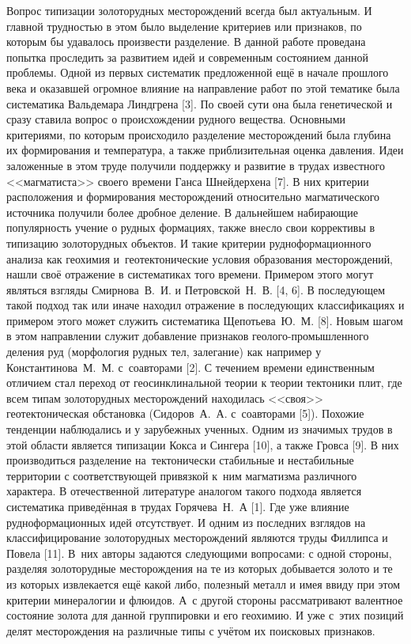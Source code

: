  

\makeProcTitle
{}

Вопрос типизации золоторудных месторождений всегда был актуальным. И главной трудностью в этом было выделение критериев или признаков, по которым бы удавалось произвести разделение. В данной работе проведана попытка проследить за развитием идей и современным состоянием данной проблемы. Одной из первых систематик предложенной ещё в начале прошлого века и оказавшей огромное влияние на направление работ по этой тематике была систематика Вальдемара Линдгрена [3]. По своей сути она была генетической и сразу ставила вопрос о происхождении рудного вещества.  Основными критериями, по которым происходило разделение месторождений была глубина их формирования и температура, а также приблизительная оценка давления. Идеи заложенные в этом труде получили поддержку и развитие в трудах известного <<магматиста>> своего времени Ганса Шнейдерхена [7]. В них критерии расположения и формирования месторождений относительно магматического источника получили более дробное деление.  В дальнейшем набирающие популярность учение о рудных формациях, также внесло свои коррективы в типизацию золоторудных объектов. И такие критерии рудноформационного анализа как геохимия и~геотектонические условия образования месторождений, нашли своё отражение в систематиках того времени. Примером этого могут являться взгляды Смирнова~В.~И. и Петровской~Н.~В. [4, 6]. В последующем такой подход так или иначе находил отражение в последующих классификациях и примером этого может служить систематика Щепотьева~Ю.~М. [8].  Новым шагом в этом направлении служит добавление признаков геолого-промышленного деления руд (морфология рудных тел, залегание) как например у Константинова~М.~М. с~соавторами [2]. С течением времени единственным отличием стал переход от геосинклинальной теории к теории тектоники плит, где всем типам золоторудных месторождений находилась <<своя>> геотектоническая обстановка (Сидоров~А.~А. с~соавторами [5]). Похожие тенденции наблюдались и у зарубежных ученных. Одним из значимых трудов в этой области является типизации Кокса и Сингера [10], а также Гровса [9]. В них производиться разделение на~тектонически стабильные и нестабильные территории с соответствующей привязкой к~ним магматизма различного характера. В отечественной литературе аналогом такого подхода является систематика приведённая в трудах Горячева~Н.~А [1]. Где уже влияние рудноформационных идей отсутствует. И одним из последних взглядов на классифицирование золоторудных месторождений являются труды Филлипса и Повела [11]. В~них авторы задаются следующими вопросами: с одной стороны, разделяя золоторудные месторождения на те из которых добывается золото и те из которых извлекается ещё какой либо, полезный металл и имея ввиду при этом критерии минералогии и флюидов. А~с другой стороны рассматривают валентное состояние золота для данной группировки и его геохимию. И уже с~этих позиций делят месторождения на различные типы с учётом их поисковых признаков. 